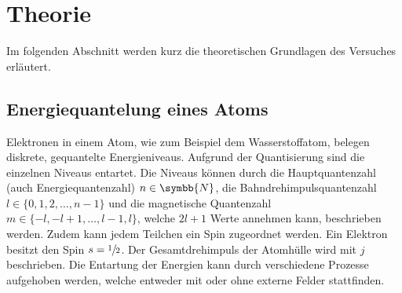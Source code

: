 \section{Theorie}
\label{sec:theorie}

    Im folgenden Abschnitt werden kurz die theoretischen Grundlagen des Versuches erläutert.


\subsection{Energiequantelung eines Atoms}

    Elektronen in einem Atom,
    wie zum Beispiel dem Wasserstoffatom,
    belegen diskrete, gequantelte Energieniveaus.
    Aufgrund der Quantisierung sind die einzelnen Niveaus entartet. %
    Die Niveaus können durch die Hauptquantenzahl (auch Energiequantenzahl) $n \in \symbb{N}$,
    die Bahndrehimpulsquantenzahl $l \in \{0, 1, 2, \ldots , n-1\}$
    und die magnetische Quantenzahl $m \in \{-l, -l+1, \ldots, l-1, l\}$,
    welche $2l + 1$ Werte annehmen kann,
    beschrieben werden.
    Zudem kann jedem Teilchen ein Spin zugeordnet werden.
    Ein Elektron besitzt den Spin $s = \sfrac{1}{2}$.
    Der Gesamtdrehimpuls der Atomhülle wird mit $j$ beschrieben. %
    Die Entartung der Energien kann durch verschiedene Prozesse aufgehoben werden,
    welche entweder mit oder ohne externe Felder stattfinden.

